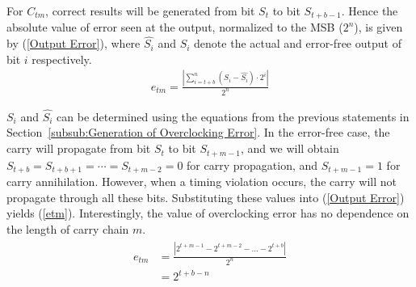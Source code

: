 \documentclass[journal]{IEEEtran}
\begin{document}
For $C_{tm}$, correct results will be generated from bit $S_t$ to bit $S_{t+b-1}$. Hence the absolute value of error seen at the output, normalized to the MSB ($2^n$), is given by (\ref{Output Error}), where $\hat{S_i}$ and $S_i$ denote the actual and error-free output of bit $i$ respectively.
%
\begin{eqnarray}\label{Output Error}
    e_{tm}=\frac{\left|\sum_{i=t+b}^{n}(S_i-\hat{S_i})\cdot 2^i\right|}{2^n}
\end{eqnarray}

$S_i$ and $\hat{S_i}$ can be determined using the equations from the previous statements in Section~\ref{subsub:Generation of Overclocking Error}. In the error-free case, the carry will propagate from bit $S_t$ to bit $S_{t+m-1}$, and we will obtain $S_{t+b}=S_{t+b+1}=\cdots=S_{t+m-2}=0$ for carry propagation, and $S_{t+m-1}=1$ for carry annihilation. However, when a timing violation occurs, the carry will not propagate through all these bits. Substituting these values into (\ref{Output Error}) yields (\ref{etm}). Interestingly, the value of overclocking error has no dependence on the length of carry chain $m$.
%
%
\begin{eqnarray}\label{etm}
  \begin{split}
    e_{tm} &= \frac{\left|2^{t+m-1}-2^{t+m-2}-\dots-2^{t+b}\right|}{2^n}\\
    &= 2^{t+b-n}
  \end{split}
\end{eqnarray}
\end{document}
